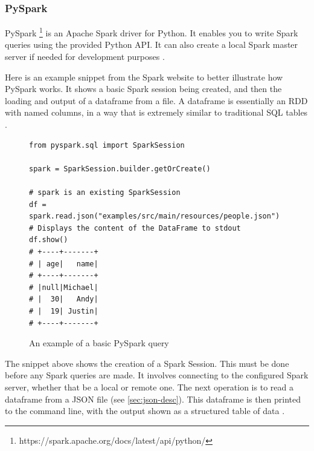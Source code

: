 \documentclass[12pt, letterpaper]{article}
\begin{document}
\subsubsection{PySpark}\label{sec:pyspark-desc}

\begin{flushleft}
PySpark
\footnote{https://spark.apache.org/docs/latest/api/python/}
is an Apache Spark driver for Python. It enables you to write Spark queries using the provided Python API. It can also create a local Spark master server if needed for development purposes \cite{pyspark-site}.
\end{flushleft}

\begin{flushleft}
Here is an example snippet from the Spark website to better illustrate how PySpark works. It shows a basic Spark session being created, and then the loading and output of a dataframe from a file. A dataframe is essentially an RDD with named columns, in a way that is extremely similar to traditional SQL tables \cite{pyspark-site}.
\end{flushleft}

\begin{flushleft}
\begin{figure}[H]
\begin{verbatim}
from pyspark.sql import SparkSession

spark = SparkSession.builder.getOrCreate()

# spark is an existing SparkSession
df = spark.read.json("examples/src/main/resources/people.json")
# Displays the content of the DataFrame to stdout
df.show()
# +----+-------+
# | age|   name|
# +----+-------+
# |null|Michael|
# |  30|   Andy|
# |  19| Justin|
# +----+-------+
\end{verbatim}
\caption{An example of a basic PySpark query \cite{pyspark-dataframes}}
\end{figure}
\end{flushleft}

\begin{flushleft}
The snippet above shows the creation of a Spark Session. This must be done before any Spark queries are made. It involves connecting to the configured Spark server, whether that be a local or remote one. The next operation is to read a dataframe from a JSON file (see \ref{sec:json-desc}). This dataframe is then printed to the command line, with the output shown as a structured table of data \cite{pyspark-dataframes}.
\end{flushleft}
\end{document}

